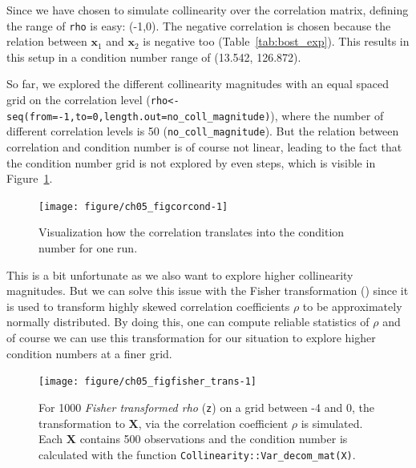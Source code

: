 \documentclass[11pt,a4paper,twoside]{book}\usepackage[]{graphicx}\usepackage[]{xcolor}
\newenvironment{knitrout}{}{} %
\begin{document}
Since we have chosen to simulate collinearity over the correlation matrix, defining the range of \texttt{rho} is easy: (-1,0). The negative correlation is chosen because the relation between $\boldsymbol{x}_1$ and $\boldsymbol{x}_2$ is negative too (Table~\ref{tab:bost_exp}). This results in this setup in a condition number range of (13.542, 126.872).

So far, we explored the different collinearity magnitudes with an equal spaced grid on the correlation level (\texttt{rho<-seq(from=-1,to=0,length.out=no\_coll\_magnitude)}), where the number of different correlation levels is 50 (\texttt{no\_coll\_magnitude}).
But the relation between correlation and condition number is of course not linear, leading to the fact that the condition number grid is not explored by even steps, which is visible in Figure~\ref{fig:corcond}. 
\begin{figure}[H]%
\begin{center}
\begin{knitrout}
\color{fgcolor}
\texttt{[image: figure/ch05\_figcorcond-1]} 
\end{knitrout}
\end{center}
\vspace{-0.8cm}
\caption{Visualization how the correlation translates into the condition number for one run.}
\label{fig:corcond}
\end{figure}
This is a bit unfortunate as we also want to explore higher collinearity magnitudes. But we can solve this issue with the Fisher transformation (\cite{Fisher1915}) since it is used to transform highly skewed correlation coefficients $\rho$ to be approximately normally distributed. By doing this, one can compute reliable statistics of $\rho$ and of course we can use this transformation for our situation to explore higher condition numbers at a finer grid.
\begin{figure}[H]%
\begin{center}
\begin{knitrout}
\color{fgcolor}
\texttt{[image: figure/ch05\_figfisher\_trans-1]} 
\end{knitrout}
\end{center}
\vspace{-0.8cm}
\caption{For 1000 \textit{Fisher transformed rho} (\texttt{z}) on a grid between -4 and 0, the transformation to $\boldsymbol{X}$, via the correlation coefficient $\rho$ is simulated. Each $\boldsymbol{X}$ contains 500 observations and the condition number is calculated with the function \texttt{Collinearity::Var\_decom\_mat(X)}.}
\label{fig:fisher_trans}
\end{figure}
\end{document}
